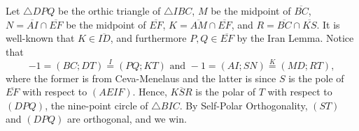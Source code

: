 Let $\triangle DPQ$ be the orthic triangle of $\triangle IBC$, $M$ be the midpoint of $\overline{BC}$, $N=\overline{AI}\cap\overline{EF}$ be the midpoint of $\overline{EF}$, $K=\overline{AM}\cap\overline{EF}$, and $R=\overline{BC}\cap\overline{KS}$. It is well-known that $K\in\overline{ID}$, and furthermore $P,Q\in\overline{EF}$ by the Iran Lemma. Notice that \[-1=(BC;DT)\stackrel I=(PQ;KT)\text{ and }-1=(AI;SN)\stackrel K=(MD;RT),\]
where the former is from Ceva-Menelaus and the latter is since $S$ is the pole of $\overline{EF}$ with respect to $(AEIF)$. Hence, $\overline{KSR}$ is the polar of $T$ with respect to $(DPQ)$, the nine-point circle of $\triangle BIC$. By Self-Polar Orthogonality, $(ST)$ and $(DPQ)$ are orthogonal, and we win.

